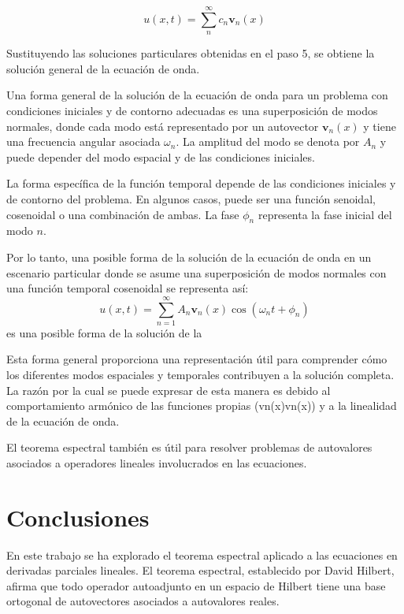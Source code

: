 \documentclass{article}
\begin{document}
    \begin{equation}
        u(x, t) = \sum_{n}^{\infty} c_n \mathbf{v}_n(x)
    \end{equation}

    Sustituyendo las soluciones particulares obtenidas en el paso 5, se obtiene la solución general de la ecuación de onda.

    Una forma general de la solución de la ecuación de onda para un problema con condiciones iniciales y de contorno adecuadas es una superposición de modos normales, donde cada modo está representado por un autovector $\mathbf{v}_n(x)$ y tiene una frecuencia angular asociada $\omega_n$. La amplitud del modo se denota por $A_n$ y puede depender del modo espacial y de las condiciones iniciales.

    La forma específica de la función temporal depende de las condiciones iniciales y de contorno del problema. En algunos casos, puede ser una función senoidal, cosenoidal o una combinación de ambas. La fase $\phi_n$ representa la fase inicial del modo $n$.

    Por lo tanto, una posible forma de la solución de la ecuación de onda en un escenario particular donde se asume una superposición de modos normales con una función temporal cosenoidal se representa así: 
    \begin{equation} 
        u(x, t) = \sum_{n=1}^{\infty} A_n \mathbf{v}_n(x) \cos(\omega_n t + \phi_n) 
    \end{equation} es una posible forma de la solución de la 
    
    Esta forma general proporciona una representación útil para comprender cómo los diferentes modos espaciales y temporales contribuyen a la solución completa. La razón por la cual se puede expresar de esta manera es debido al comportamiento armónico de las funciones propias (vn(x)vn(x)) y a la linealidad de la ecuación de onda.

    El teorema espectral también es útil para resolver problemas de autovalores asociados a operadores lineales involucrados en las ecuaciones.

\newpage

\section{Conclusiones}

En este trabajo se ha explorado el teorema espectral aplicado a las ecuaciones en derivadas parciales lineales. El teorema espectral, establecido por David Hilbert, afirma que todo operador autoadjunto en un espacio de Hilbert tiene una base ortogonal de autovectores asociados a autovalores reales.
\end{document}
